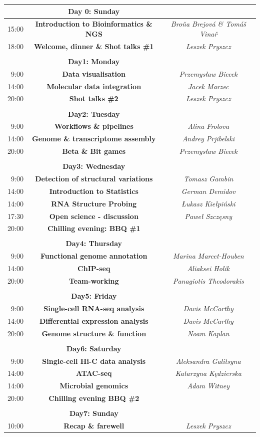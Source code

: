 \documentclass[a4paper,11pt]{book}
\begin{document}
\smallskip
\begin{tabular}{ r >{\bfseries}c >{\itshape}c }
& Day 0: Sunday	\\ \hline
15:00 & Introduction to Bioinformatics \& NGS & Bro\v{n}a Brejov\'a \& Tom\'a\v{s} Vina\v{r} \\
18:00 & Welcome, dinner \& Shot talks \#1 & Leszek Pryszcz \\
\\
& Day1: Monday \\ \hline
9:00 & Data visualisation & Przemysław Biecek \\
14:00 & Molecular data integration & Jacek Marzec \\
20:00 & Shot talks \#2 & Leszek Pryszcz \\
\\
& Day2: Tuesday \\ \hline
9:00 & Workflows \& pipelines & Alina Frolova \\
14:00 & Genome \& transcriptome assembly & Andrey Prjibelski \\
20:00 & Beta \& Bit games & Przemysław Biecek \\
\\
& Day3: Wednesday \\ \hline
9:00 & Detection of structural variations & Tomasz Gambin \\
14:00 & Introduction to Statistics & German Demidov \\
14:00 & RNA Structure Probing & Łukasz Kiełpi\'nski \\
17:30 & Open science - discussion & Paweł Szczęsny \\
20:00 & Chilling evening: BBQ \#1 & \\
\\
& Day4: Thursday \\ \hline
9:00 & Functional genome annotation & Marina Marcet-Houben \\
14:00 & ChIP-seq & Aliaksei Holik \\
20:00 & Team-working & Panagiotis Theodorakis \\

\\
& Day5: Friday \\ \hline
9:00 & Single-cell RNA-seq analysis & Davis McCarthy \\
14:00 & Differential expression analysis & Davis McCarthy \\
20:00 & Genome structure \& function & Noam Kaplan \\
\\
& Day6: Saturday \\ \hline
9:00 & Single-cell Hi-C data analysis & Aleksandra Galitsyna \\
14:00 & ATAC-seq & Katarzyna Kędzierska \\
14:00 & Microbial genomics & Adam Witney \\
20:00 & Chilling evening BBQ \#2 & \\
\\
& Day7: Sunday \\ \hline
10:00 & Recap \& farewell & Leszek Pryszcz\\
\end{tabular}


\newpage
{}


\end{document}

